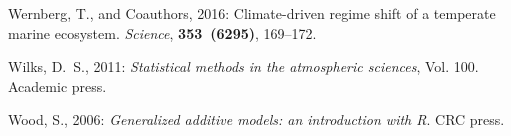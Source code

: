 \documentclass[twocol]{ametsoc}
\begin{document}
\begin{thebibliography}{41}
Wernberg, T., and Coauthors, 2016: {Climate-driven regime shift of a temperate
  marine ecosystem}. \textit{Science}, \textbf{353~(6295)}, 169--172.

Wilks, D.~S., 2011: \textit{Statistical methods in the atmospheric sciences},
  Vol. 100. Academic press.

Wood, S., 2006: \textit{Generalized additive models: an introduction with R}.
  CRC press.

\end{thebibliography}

%
\end{document}
